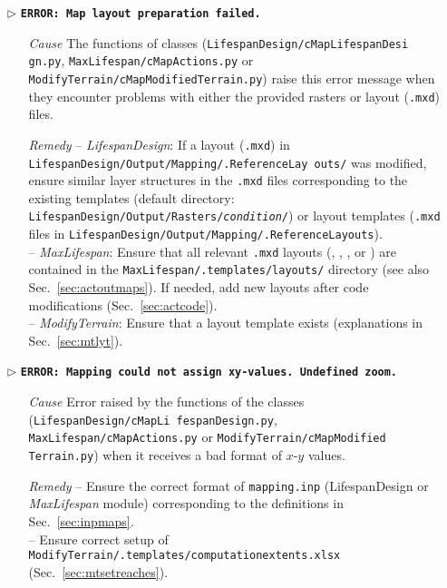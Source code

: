 \begin{itemize}
	\item[$\triangleright$]\textbf{\texttt{ERROR: Map layout preparation failed.}}
	\begin{itemize}
		\item[\textit{Cause}\hspace{0.27cm}] The  functions of  classes (\texttt{LifespanDesign/cMapLifespanDesi gn.py}, \texttt{MaxLifespan/cMapActions.py} or \texttt{ModifyTerrain/cMapModifiedTerrain.py}) raise this error message when they encounter problems with either the provided rasters or layout (\texttt{.mxd}) files.
		\item[\textit{Remedy}] -- \textit{LifespanDesign}: If a layout (\texttt{.mxd}) in \texttt{LifespanDesign/Output/Mapping/.ReferenceLay outs/} was modified, ensure similar layer structures in the \texttt{.mxd} files corresponding to the existing templates  (default directory: \texttt{LifespanDesign/Output/Rasters/\textit{condition}/}) or layout templates (\texttt{.mxd} files in \texttt{LifespanDesign/Output/Mapping/.ReferenceLayouts}).\\
							  -- \textit{MaxLifespan}: Ensure that all relevant \texttt{.mxd} layouts (, , , or ) are contained in the \texttt{MaxLifespan/.templates/layouts/} directory (see also Sec.~\ref{sec:actoutmaps}). If needed, add new layouts after code modifications (Sec.~\ref{sec:actcode}).\\
								-- \textit{ModifyTerrain}: Ensure that a layout template exists (explanations in Sec.~\ref{sec:mtlyt}).\\
	\end{itemize}
	
	\item[$\triangleright$]\textbf{\texttt{ERROR: Mapping could not assign xy-values. Undefined zoom.}}
	\begin{itemize}
		\item[\textit{Cause}\hspace{0.27cm}] Error raised by the  functions of the  classes (\texttt{LifespanDesign/cMapLi fespanDesign.py}, \texttt{MaxLifespan/cMapActions.py} or \texttt{ModifyTerrain/cMapModified\\Terrain.py}) when it receives a bad format of $x$-$y$ values.
		\item[\textit{Remedy}] -- Ensure the correct format of \texttt{mapping.inp} (LifespanDesign or \textit{MaxLifespan} module) corresponding to the definitions in Sec.~\ref{sec:inpmaps}.\\
													 -- Ensure correct setup of \texttt{ModifyTerrain/.templates/computation{\myUnderscore}extents.xlsx}\\(Sec.~\ref{sec:mtsetreaches}).\\
	\end{itemize}
	

\end{itemize}
